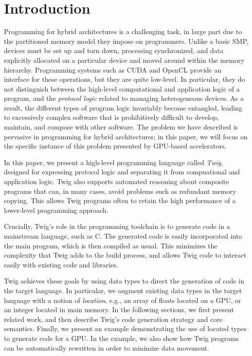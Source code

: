 
\section{Introduction}

Programming for hybrid architectures is a challenging task, in large part due to the partitioned memory model they impose on programmers. Unlike a basic SMP, devices must be set up and torn down, processing synchronized, and data explicitly allocated on a particular device and moved around within the memory hierarchy. Programming systems such as CUDA\cite{cuda} and OpenCL\cite{opencl} provide an interface for these operations, but they are quite low-level. In particular, they do not distinguish between the high-level computational and application logic of a program, and the \emph{protocol logic} related to managing heterogeneous devices. As a result, the different types of program logic invariably become entangled, leading to excessively complex software that is prohibitively difficult to develop, maintain, and compose with other software. The problem we have described is pervasive in programming for hybrid architectures; in this paper, we will focus on the specific instance of this problem presented by GPU-based accelerators.

In this paper, we present a high-level programming language called \emph{Twig}, designed for expressing protocol logic and separating it from compuational and application logic. Twig also  supports automated reasoning about composite programs that can, in many cases, avoid problems such as redundant memory copying. This allows Twig programs often to retain the high performance of a lower-level programming approach.

Crucially, Twig's role in the programming toolchain is to generate code in a mainstream language, such as C. The generated code is easily incorporated into the main program, which is then compiled as usual. This minimizes the complexity that Twig adds to the build process, and allows Twig code to interact easily with existing code and libraries.

Twig achieves these goals by using data types to direct the generation of code in the target language. In particular, we augment existing data types in the target language with a notion of \emph{location}, e.g., an array of floats located on a GPU, or an integer located in main memory. In the following sections, we first present related work, and then describe Twig's code generation strategy and core semantics. Finally, we present an example demonstrating the use of located types to generate code for a GPU. In the example, we also show how Twig programs can be automatically rewritten in order to minimize data movement.
